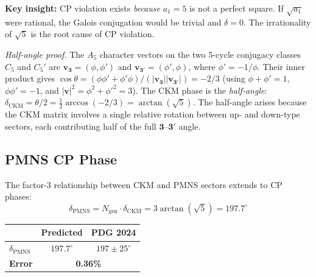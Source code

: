 \documentclass[12pt,a4paper]{article}
\theoremstyle{definition}
\begin{document}
\textbf{Key insight:} CP violation exists \emph{because} $a_1 = 5$ is not a perfect square. If $\sqrt{a_1}$ were rational, the Galois conjugation would be trivial and $\delta = 0$. The irrationality of $\sqrt{5}$ is the root cause of CP violation.

\textit{Half-angle proof.}  The $A_5$ character vectors on the two 5-cycle conjugacy classes $C_5$ and $C_5'$ are $\mathbf{v}_{\mathbf{3}} = (\phi, \phi')$ and $\mathbf{v}_{\mathbf{3'}} = (\phi', \phi)$, where $\phi' = -1/\phi$.  Their inner product gives $\cos\theta = (\phi\phi' + \phi'\phi)/(|\mathbf{v}_{\mathbf{3}}||\mathbf{v}_{\mathbf{3'}}|) = -2/3$ (using $\phi + \phi' = 1$, $\phi\phi' = -1$, and $|\mathbf{v}|^2 = \phi^2 + \phi'^2 = 3$).  The CKM phase is the \emph{half-angle}: $\delta_{\text{CKM}} = \theta/2 = \tfrac{1}{2}\arccos(-2/3) = \arctan(\sqrt{5})$.  The half-angle arises because the CKM matrix involves a single relative rotation between up- and down-type sectors, each contributing half of the full $\mathbf{3}$--$\mathbf{3'}$ angle.

\subsection{PMNS CP Phase}

The factor-3 relationship between CKM and PMNS sectors extends to CP phases:
\begin{equation}
\boxed{\delta_{\text{PMNS}} = N_{\text{gen}} \cdot \delta_{\text{CKM}} = 3\arctan(\sqrt{5}) = 197.7^\circ}
\end{equation}
\begin{center}
\begin{tabular}{lcc}
\toprule
& \textbf{Predicted} & \textbf{PDG 2024} \\
\midrule
$\delta_{\text{PMNS}}$ & $197.7^\circ$ & $197 \pm 25^\circ$ \\
\textbf{Error} & \multicolumn{2}{c}{\textbf{0.36\%}} \\
\bottomrule
\end{tabular}
\end{center}
\end{document}
